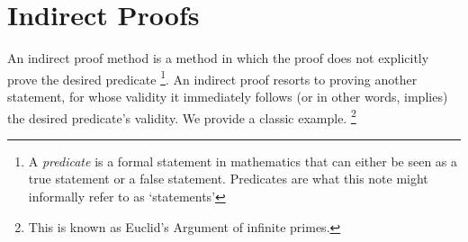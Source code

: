 \documentclass[../proofs.tex]{subfiles}
\begin{document}
\chapter{Indirect Proofs} \label{chap: indirect}
An indirect proof method is a method in which the proof does not explicitly prove the desired predicate \footnote{A \emph{predicate} is a formal statement in mathematics that can either be seen as a true statement or a false statement. Predicates are what this note might informally refer to as `statements'}. An indirect proof resorts to proving another statement, for whose validity it immediately follows (or in other words, implies) the desired predicate's validity. We provide a classic example. \footnote{This is known as Euclid's Argument of infinite primes.} \\
\end{document}
